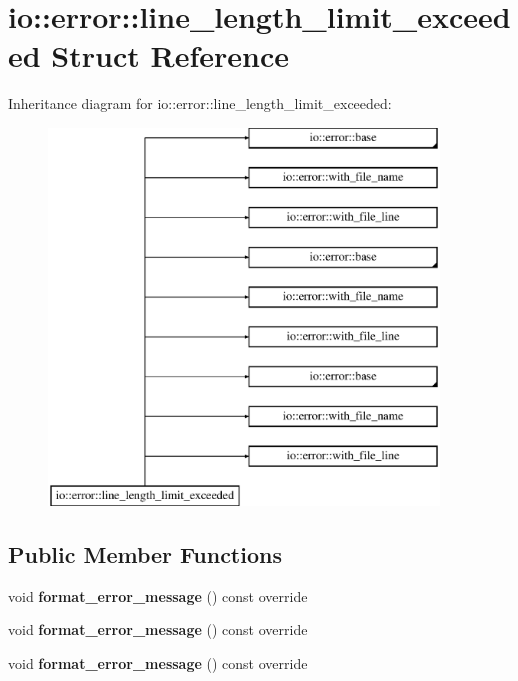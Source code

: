 \hypertarget{structio_1_1error_1_1line__length__limit__exceeded}{}\section{io\+:\+:error\+:\+:line\+\_\+length\+\_\+limit\+\_\+exceeded Struct Reference}
\label{structio_1_1error_1_1line__length__limit__exceeded}
Inheritance diagram for io\+:\+:error\+:\+:line\+\_\+length\+\_\+limit\+\_\+exceeded\+:\begin{figure}[H]
\begin{center}
\leavevmode
\includegraphics[height=10.000000cm]{db/d37/structio_1_1error_1_1line__length__limit__exceeded}
\end{center}
\end{figure}
\subsection*{Public Member Functions}
\begin{DoxyCompactItemize}
\item 
\mbox{\label{structio_1_1error_1_1line__length__limit__exceeded_a4d514daa0b72c8b3f147699c42245eb6}} 
void {\bfseries format\+\_\+error\+\_\+message} () const override
\item 
\mbox{\label{structio_1_1error_1_1line__length__limit__exceeded_a4d514daa0b72c8b3f147699c42245eb6}} 
void {\bfseries format\+\_\+error\+\_\+message} () const override
\item 
\mbox{\label{structio_1_1error_1_1line__length__limit__exceeded_a4d514daa0b72c8b3f147699c42245eb6}} 
void {\bfseries format\+\_\+error\+\_\+message} () const override
\end{DoxyCompactItemize}
